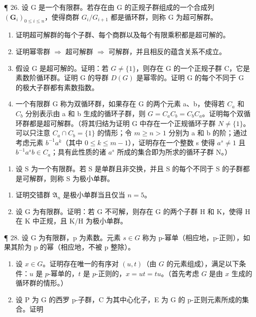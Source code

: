 ¶ 26. 设 G 是一个有限群。若存在由 G 的正规子群组成的一个合成列 \((\mathbf{G}_{i})_{0\leqslant i\leqslant n}\)，使得商群 \(G_{i}/G_{i+1}\) 都是循环群，则称 G 为超可解群。

\begin{enumerate}
\def\labelenumi{(\alph{enumi})}
\item
  证明超可解群的每个子群、每个商群以及每个有限乘积都是超可解的。
\item
  证明幂零群 \(\Rightarrow\) 超可解群 \(\Rightarrow\) 可解群，并且相反的蕴含关系不成立。
\item
  假设 G 是超可解的。证明：若 \(G \neq \{1\}\)，则存在 G 的一个正规子群 C，它是素数阶循环群。证明 G 的导群 \(D(G)\) 是幂零的。证明 G 的每个不同于 G 的极大子群都有素数指数。
\item
  一个有限群 G 称为双循环群，如果存在 G 的两个元素 a、b，使得若 \(C_{a}\) 和 \(C_{b}\) 分别表示由 a 和 b 生成的循环子群，则 \(G = C_{a}C_{b} = C_{b}C_{a}\)。证明每个双循环群都是超可解群。（将其归结为证明 G 中存在一个正规循环子群 \(N \neq \{1\}\)。可以只注意 \(C_{a} \cap C_{b} = \{1\}\) 的情形；令 \(m \geqslant n > 1\) 分别为 a 和 b 的阶；通过考虑元素 \(b^{-1}a^{k}\)（其中 \(0 \leqslant k \leqslant m - 1\)），证明存在一个整数 s 使得 \(a^{s} \neq 1\) 且 \(b^{-1}a^{s}b \in C_{a}\)；具有此性质的诸 \(a^{s}\) 所成的集合即为所求的循环子群 N。）
\end{enumerate}

\begin{enumerate}
\def\labelenumi{\arabic{enumi}。}
\setcounter{enumi}{26}
\tightlist
\item
  设 S 为一个有限群。若 S 是单群且非交换，并且 S 的每个不同于 S 的子群都是可解群，则称 S 为极小单群。
\end{enumerate}

\begin{enumerate}
\def\labelenumi{(\alph{enumi})}
\item
  证明交错群 \(\mathfrak{A}_n\) 是极小单群当且仅当 \(n = 5\)。
\item
  设 G 为有限群。证明：若 G 不可解，则存在 G 的两个子群 H 和 K，使得 H 在 K 中正规，且 K/H 为极小单群。
\end{enumerate}

¶ 28. 设 G 为有限群，p 为素数。元素 \(s \in G\) 称为 p-幂单（相应地，p-正则），如果其阶为 p 的幂（相应地，不被 p 整除）。

\begin{enumerate}
\def\labelenumi{(\alph{enumi})}
\item
  设 \(x \in G\)。证明存在唯一的有序对 \((u, t)\)（由 \(G\) 的元素组成），满足以下条件：\(u\) 是 \(p\)-幂单的，\(t\) 是 \(p\)-正则的，\(x = ut = tu\)。（首先考虑 \(G\) 是由 \(x\) 生成的循环群的情形。）
\item
  设 P 为 G 的西罗 p-子群，C 为其中心化子，E 为 G 的 p-正则元素所成的集合。证明
\end{enumerate}

